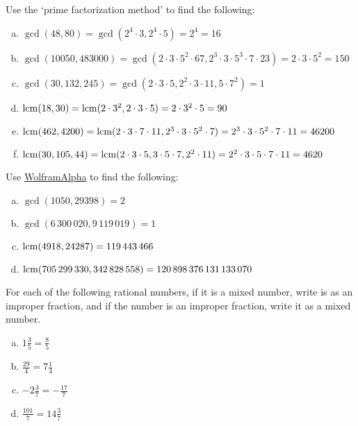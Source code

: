 \documentclass[11pt,letterpaper]{article}
\begin{document}
 Use the `prime factorization method' to find the following: \pspace
\begin{enumerate}[(a)]
\item $\gcd(48, 80)= \gcd(2^4 \cdot 3, 2^4 \cdot 5)= 2^4= 16$ \vfill
\item $\gcd(10050, 483000)= \gcd(2 \cdot 3 \cdot 5^2 \cdot 67, 2^3 \cdot 3 \cdot 5^3 \cdot 7 \cdot 23)= 2 \cdot 3 \cdot 5^2= 150$ \vfill
\item $\gcd(30, 132, 245)= \gcd(2 \cdot 3 \cdot 5, 2^2 \cdot 3 \cdot 11, 5 \cdot 7^2)= 1$ \vfill
\item $\operatorname{lcm}(18,30)= \operatorname{lcm}(2 \cdot 3^2, 2 \cdot 3 \cdot 5)=  2 \cdot 3^2 \cdot 5= 90$ \vfill
\item $\operatorname{lcm}(462,4200)= \operatorname{lcm}(2 \cdot 3 \cdot 7 \cdot 11, 2^3 \cdot 3 \cdot 5^2 \cdot 7)= 2^3 \cdot 3 \cdot 5^2 \cdot 7 \cdot 11= 46200$ \vfill
\item $\operatorname{lcm}(30, 105, 44)= \operatorname{lcm}(2 \cdot 3 \cdot 5, 3 \cdot 5 \cdot 7, 2^2 \cdot 11)= 2^2 \cdot 3 \cdot 5 \cdot 7 \cdot 11= 4620$ \vfill
\end{enumerate}



\newpage



 Use \href{https://www.wolframalpha.com/}{WolframAlpha} to find the following: \pspace
\begin{enumerate}[(a)] 
\item $\gcd(1050, 29398)= 2$ \vspace{0.5cm}
\item $\gcd(6\,300\,020, 9\,119\,019)= 1$ \vspace{0.5cm}
\item $\operatorname{lcm}(4918, 24287)= 119\,443\,466$ \vspace{0.5cm}
\item $\operatorname{lcm}(705\,299\,330, 342\,828\,558)= 120\,898\,376\,131\,133\,070$ \vspace{0.5cm}
\end{enumerate}



\vfill



 For each of the following rational numbers, if it is a mixed number, write is as an improper fraction, and if the number is an improper fraction, write it as a mixed number. \pspace
\begin{enumerate}[(a)] \itemsep=2ex
\item $1\frac{3}{5}= \frac{8}{5}$
\item $\frac{29}{4}= 7\frac{1}{4}$
\item $-2\frac{3}{7}= -\frac{17}{7}$
\item $\frac{101}{7}= 14\frac{3}{7}$
\end{enumerate} \pspace
\end{document}
